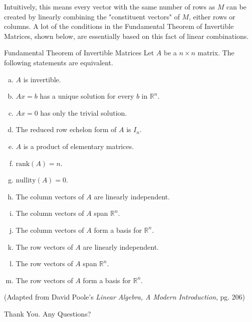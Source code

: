 \documentclass[12pt]{extarticle}
\newcommand{\R}{\mathbb{R}}
\begin{document}
  \vspace{10cm}
  Intuitively, this means every vector with the same number of rows as $M$ can be created by linearly combining the "constituent vectors" of $M$, either rows or columns.
  \newpage
  A lot of the conditions in the Fundamental Theorem of Invertible Matrices, shown below, are essentially based on this fact of linear combinations.
  \begin{problem}{Fundamental Theorem of Invertible Matrices}
    Let $A $ be a $ n\times n$ matrix. The following statements are equivalent.
    \begin{enumerate}[(a)]
      \item $A$ is invertible.
      \item $Ax = b$ has a unique solution for every $b$ in $\R^n$.
      \item $Ax = 0$ has only the trivial solution.
      \item The reduced row echelon form of $A$ is $I_n$.
      \item $A$ is a product of elementary matrices.
      \item $\text{rank}(A) = n$.
      \item $\text{nullity}(A) = 0$.
      \item The column vectors of $A$ are linearly independent.
      \item The column vectors of $A$ span $\R^n$.
      \item The column vectors of $A$ form a basis for $\R^n$.
      \item The row vectors of $A$ are linearly independent.
      \item The row vectors of $A$ span $\R^n$.
      \item The row vectors of $A$ form a basis for $\R^n$.
    \end{enumerate}
    (Adapted from David Poole's \textit{Linear Algebra, A Modern Introduction}, pg. 206)
  \end{problem}
  \newpage
  \begin{center}
    \large Thank You. Any Questions?
  \end{center}
\end{document}
